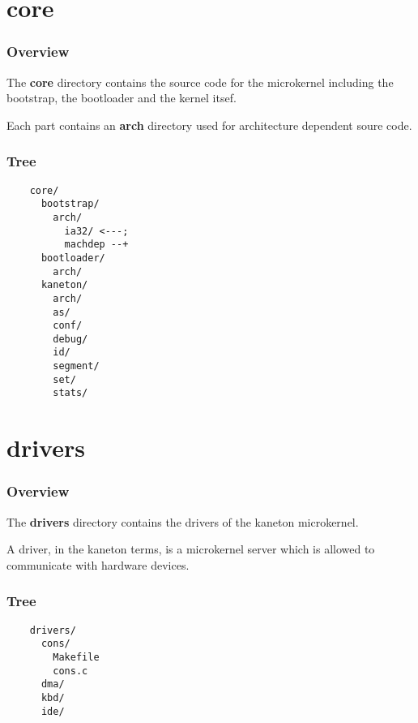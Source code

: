 %
%

\section{core}


\begin{frame}
  \frametitle{Overview}

  The \textbf{core} directory contains the source code for the microkernel
  including the bootstrap, the bootloader and the kernel itsef.

  \nl

  Each part contains an \textbf{arch} directory used for architecture
  dependent soure code.
\end{frame}


\begin{frame}[containsverbatim]
  \frametitle{Tree}

  \begin{verbatim}
    core/
      bootstrap/
        arch/
          ia32/ <---;
          machdep --+
      bootloader/
        arch/
      kaneton/
        arch/
        as/
        conf/
        debug/
        id/
        segment/
        set/
        stats/
  \end{verbatim}
\end{frame}

%
%

\section{drivers}


\begin{frame}
  \frametitle{Overview}

  The \textbf{drivers} directory contains the drivers of the kaneton
  microkernel.

  \nl

  A driver, in the kaneton terms, is a microkernel server which is allowed
  to communicate with hardware devices.
\end{frame}


\begin{frame}[containsverbatim]
  \frametitle{Tree}

  \begin{verbatim}
    drivers/
      cons/
        Makefile
        cons.c
      dma/
      kbd/
      ide/
  \end{verbatim}
\end{frame}


